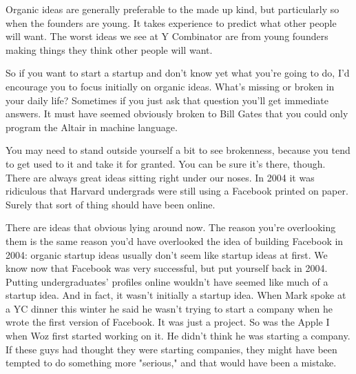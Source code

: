 Organic
                    ideas are generally preferable to the made up kind, but
                    particularly so when the founders are young. It takes
                    experience to predict what other people will want. The worst
                    ideas we see at Y Combinator are from young founders making
                    things they think other people will want.

So if
                    you want to start a startup and don't know yet what you're
                    going to do, I'd encourage you to focus initially on organic
                    ideas. What's missing or broken in your daily life?
                    Sometimes if you just ask that question you'll get immediate
                    answers. It must have seemed obviously broken to Bill Gates
                    that you could only program the Altair in machine
                    language.

You may need to stand outside yourself
                    a bit to see brokenness, because you tend to get used to it
                    and take it for granted. You can be sure it's there, though.
                    There are always great ideas sitting right under our noses.
                    In 2004 it was ridiculous that Harvard undergrads were still
                    using a Facebook printed on paper. Surely that sort of thing
                    should have been online.

There are ideas that
                    obvious lying around now. The reason you're overlooking them
                    is the same reason you'd have overlooked the idea of
                    building Facebook in 2004: organic startup ideas usually
                    don't seem like startup ideas at first. We know now that
                    Facebook was very successful, but put yourself back in 2004.
                    Putting undergraduates' profiles online wouldn't have seemed
                    like much of a startup idea. And in fact, it wasn't
                    initially a startup idea. When Mark spoke at a YC dinner
                    this winter he said he wasn't trying to start a company when
                    he wrote the first version of Facebook. It was just a
                    project. So was the Apple I when Woz first started working
                    on it. He didn't think he was starting a company. If these
                    guys had thought they were starting companies, they might
                    have been tempted to do something more "serious," and that
                    would have been a mistake.

